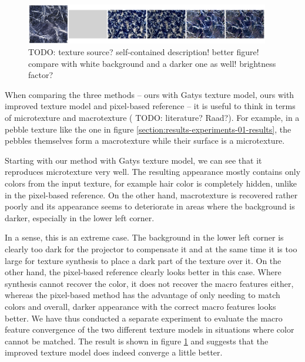 \begin{figure}[ht]
    \begin{center}
        \includegraphics[width=0.95\textwidth]{images/ex02-isolating_issues-crop.png}
        \caption{{\color{red} TODO: texture source? self-contained description! better figure! compare with white background and a darker one as well! brightness factor?}}
        \label{fig:ex02-issues}
    \end{center}
\end{figure}

When comparing the three methods -- ours with Gatys texture model, ours with improved texture model and pixel-based reference -- it is useful to think in terms of microtexture and macrotexture ({\color{red} TODO: literature? Raad?}). For example, in a pebble texture like the one in figure \ref{section:results-experiments-01-results}, the pebbles themselves form a macrotexture while their surface is a microtexture.

Starting with our method with Gatys texture model, we can see that it reproduces microtexture very well. The resulting appearance mostly contains only colors from the input texture, for example hair color is completely hidden, unlike in the pixel-based reference. On the other hand, macrotexture is recovered rather poorly and its appearance seems to deteriorate in areas where the background is darker, especially in the lower left corner.

In a sense, this is an extreme case. The background in the lower left corner is clearly too dark for the projector to compensate it and at the same time it is too large for texture synthesis to place a dark part of the texture over it. On the other hand, the pixel-based reference clearly looks better in this case. Where synthesis cannot recover the color, it does not recover the macro features either, whereas the pixel-based method has the advantage of only needing to match colors and overall, darker appearance with the correct macro features looks better. We have thus conducted a separate experiment to evaluate the macro feature convergence of the two different texture models in situations where color cannot be matched. The result is shown in figure \ref{fig:ex02-issues} and suggests that the improved texture model does indeed converge a little better.

